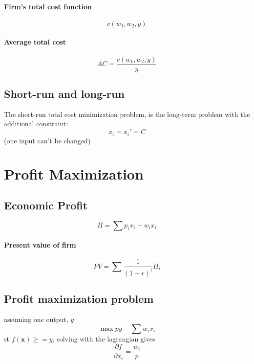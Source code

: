 \documentclass[a4paper] {scrartcl}
\begin{document}
\paragraph{Firm's total cost function} %
\label{par:firm_s_total_cost_function}
\begin{equation}
	c(w_1, w_2, y)
\end{equation}

\paragraph{Average total cost} %
\label{par:average_total_cost}
\begin{equation}
	AC = \frac{c(w_1,w_2,y)}{y}
\end{equation}

\subsection{Short-run and long-run}
The short-run total cost minimization problem, is the long-term problem with the additional constraint:
\begin{equation}
	x_i = x_i' = C
\end{equation}
(one input can't be changed)

\section{Profit Maximization}
\subsection{Economic Profit}
\begin{equation}
	\Pi = \sum p_ix_i-w_ix_i
\end{equation}

\paragraph{Present value of firm} %
\label{par:present_value_of_firm}
\begin{equation}
	PV = \sum \frac{1}{(1+r)^i}\Pi_i
\end{equation}

\subsection{Profit maximization problem}
assuming one output, $y$
\begin{equation}
	\max py -\sum w_ix_i
\end{equation}
st $f(\mathbf{x})\geq = y$,  solving with the lagrangian gives
\begin{equation}
	\frac{\partial f}{\partial x_i}=\frac{w_i}{p}
\end{equation}
\end{document}
